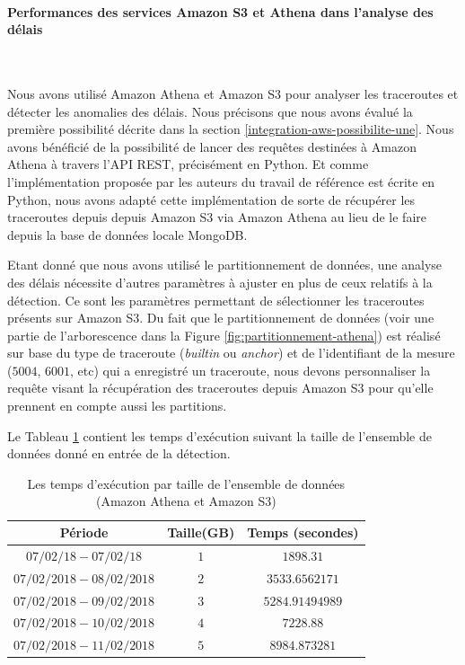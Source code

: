 \paragraph{Performances des services Amazon S3 et Athena dans l'analyse des délais }~ \label{aws-perforsm}

Nous avons utilisé Amazon Athena et Amazon S3 pour analyser les traceroutes et détecter les anomalies des délais. Nous précisons que nous avons évalué la première possibilité décrite dans la section \ref{integration-aws-possibilite-une}. Nous avons bénéficié de la  possibilité  de lancer des requêtes destinées à Amazon Athena à travers l'API REST, précisément en Python. Et comme l'implémentation proposée par les auteurs du travail de référence est écrite en Python, nous avons adapté cette implémentation de sorte  de récupérer les traceroutes depuis   depuis Amazon S3 via Amazon Athena au   lieu de le faire depuis la base de données locale MongoDB.  

Etant donné que nous avons utilisé le partitionnement de données, une analyse des délais nécessite d'autres paramètres à ajuster en plus de ceux relatifs à la détection. Ce sont les paramètres permettant de sélectionner les traceroutes présents sur Amazon S3. Du fait que le partitionnement de données (voir une partie de l'arborescence dans la Figure 	\ref{fig:partitionnement-athena}) est réalisé sur base du type de traceroute (\textit{builtin} ou \textit{anchor}) et de l'identifiant de la mesure ($ 5004 $, $6001$, etc) qui a enregistré un traceroute, nous devons personnaliser  la requête visant la   récupération des traceroutes  depuis Amazon S3 pour qu'elle prennent en compte aussi les partitions.

Le Tableau \ref{tab:athena-data} contient les temps d'exécution suivant la taille de l'ensemble de données donné en entrée de la détection.

\begin{table}[H]
	\centering
	\captionsetup{justification=centering}
\begin{tabular}{c c c}
	\textbf{Période} & \textbf{Taille(GB)} & \textbf{Temps (secondes) } \\ 	\hline 
$ 07/02/18 - 07/02/18 $	&$ 1 $&	$ 1898.31 $ \\ 	\hline 
$ 07/02/2018 - 08/02/2018 $	&$ 2 $&	$ 3533.6562171 $ \\ 	\hline 
$ 07/02/2018 - 09/02/2018 $&	$ 3 $&	$ 5284.91494989  $ \\ 	\hline 
$ 07/02/2018 - 10/02/2018 $	&$ 4 $&$ 	7228.88 $  \\ 	\hline 
$ 07/02/2018 - 11/02/2018 $	&$ 5 $& $ 8984.873281	 $ \\ 	\hline 
\end{tabular} 
\caption{Les temps d'exécution par taille de l'ensemble de données (Amazon Athena et Amazon S3)}
\label{tab:athena-data}
\end{table}

